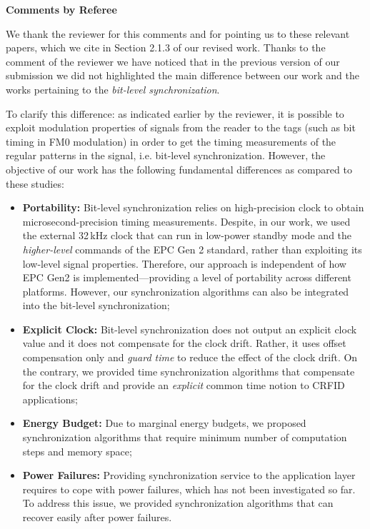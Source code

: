 \documentclass[10pt]{article}
\newcommand{\response}[1]{{\color{blue} #1}}
\newcounter{refereeCounter}
\newenvironment{responses}{%
\refstepcounter{refereeCounter}%
\textbf{\large Comments by Referee \therefereeCounter}
\begin{enumerate}%
\renewcommand{\labelenumi}{\textbf{[R\therefereeCounter :\,\arabic{enumi}]}} %
}{\end{enumerate}}
\begin{document}
\begin{responses}
\response{
We thank the reviewer for this comments and for pointing us to these relevant papers, which we cite in Section 2.1.3 of our revised work. Thanks to the comment of the reviewer we have noticed that in the previous version of our submission we did not highlighted the main difference between our work and the works pertaining to the \emph{bit-level synchronization}.

To clarify this difference: as indicated earlier by the reviewer, it is possible to exploit modulation properties of signals from the reader to the tags (such as bit timing in FM0 modulation) in order to get the timing measurements of the regular patterns in the signal, i.e. bit-level synchronization. However, the objective of our work has the following fundamental differences as compared to these studies:

\begin{itemize}
	\item \textbf{Portability:} Bit-level synchronization relies on high-precision clock to obtain microsecond-precision timing measurements. Despite, in our work, we used the external 32\,kHz clock that can run in low-power standby mode and the \emph{higher-level} commands of the EPC Gen 2 standard, rather than exploiting its low-level signal properties. Therefore, our approach is independent of how EPC Gen2 is implemented---providing a level of portability across different platforms. However, our synchronization algorithms can also be integrated into the bit-level synchronization;
	
	\item \textbf{Explicit Clock:} Bit-level synchronization does not output an explicit clock value and it does not compensate for the clock drift. Rather, it uses offset compensation only and \emph{guard time} to reduce the effect of the clock drift. On the contrary, we provided time synchronization algorithms that compensate for the clock drift and provide an \emph{explicit} common time notion to CRFID applications;
	
	\item \textbf{Energy Budget:} Due to marginal energy budgets, we proposed synchronization algorithms that require minimum number of computation steps and memory space;
	
	\item \textbf{Power Failures:} Providing synchronization service to the application layer requires to cope with power failures, which has not been investigated so far. To address this issue, we provided synchronization algorithms that can recover easily after power failures.
\end{itemize}

}
\end{responses}
\end{document}
